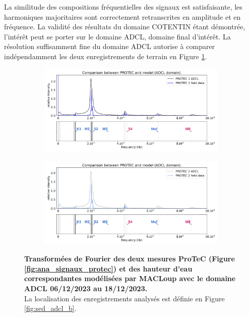 \documentclass[10pt,a4paper,titlepage]{article}
\begin{document}
La similitude des compositions fréquentielles des signaux est satisfaisante, les harmoniques majoritaires sont correctement retranscrites en amplitude et en fréquence.
La validité des résultats du domaine COTENTIN étant démontrée, l'intérêt peut se porter sur le domaine ADCL, domaine final d'intérêt.
La résolution suffisamment fine du domaine ADCL autorise à comparer indépendamment les deux enregistrements de terrain en Figure \ref{fig:ana_comp_protec_ADCL}.

\begin{figure}[h!]
	\centering
	\begin{subfigure}{1.\linewidth}
		\centering
		\includegraphics[scale=0.4]{../images/post_traitement/ADCL_5_analyse_PROTEC1_field.pdf}
	\end{subfigure}
	\begin{subfigure}{1.\linewidth}
		\centering
		\includegraphics[scale=0.4]{../images/post_traitement/ADCL_5_analyse_PROTEC2_field.pdf}
	\end{subfigure}
	\caption{
		\textbf{Transformées de Fourier des deux mesures ProTeC (Figure \ref{fig:ana_signaux_protec}) et des hauteur d'eau correspondantes modélisées par MACLoup avec le domaine ADCL 06/12/2023 au 18/12/2023.}\\
		La localisation des enregistrements analysés est définie en Figure \ref{fig:sed_adcl_b}.
	}
	\label{fig:ana_comp_protec_ADCL}
\end{figure}
\end{document}
